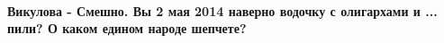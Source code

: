  
 
 
 
 
\paragraph{Викулова - Смешно. Вы 2 мая 2014 наверно водочку с олигархами и ... пили?  О каком едином народе шепчете?}
\label{sec:14_07_2021.fb.krjukova_svetlana.1.statja_putina_mnenie.cmt.vikulova_2_maja_2014_oligarhi}

